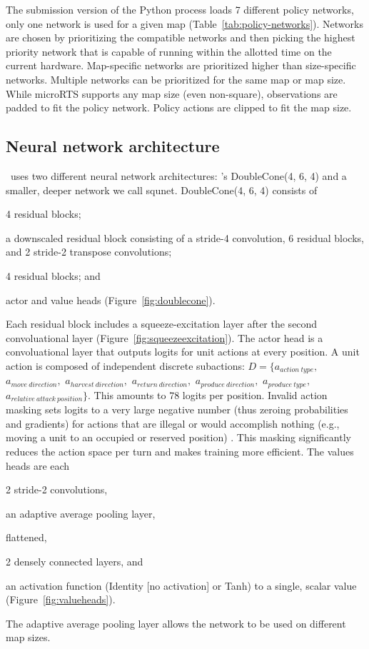\documentclass{article}
\begin{document}
The submission version of the Python process loads 7 different policy networks, only one network is used
for a given map (Table~\ref{tab:policy-networks}). Networks are chosen by prioritizing
the compatible networks and then picking the highest priority network that is capable of
running within the allotted time on the current hardware. Map-specific networks are
prioritized higher than size-specific networks. Multiple networks can be prioritized for
the same map or map size. While microRTS supports any map size (even non-square),
observations are padded to fit the policy network. Policy actions are clipped to fit the
map size.

\subsection{Neural network architecture}
\agentName\ uses two different neural network architectures: \citet{Ferdinand2021doublecone}'s DoubleCone(4, 6, 4) and a smaller, deeper network
we call squnet. DoubleCone(4, 6, 4) consists of
\begin{inparaenum}[(1)]
    \item 4 residual blocks;
    \item a downscaled residual block consisting of a stride-4 convolution, 6 residual blocks, and
        2 stride-2 transpose convolutions;
    \item 4 residual blocks; and
    \item actor and value heads (Figure~\ref{fig:doublecone}).
\end{inparaenum}
Each residual block includes a squeeze-excitation layer after the second convoluational
layer (Figure~\ref{fig:squeezeexcitation}). The actor head is a convoluational layer
that outputs logits for unit actions at every position. A unit action is composed of
independent discrete subactions: $D = \{a_{action\ type},$ $a_{move\ direction},$ $a_{harvest\
direction},$ $a_{return\ direction},$ $a_{produce\ direction},$ $a_{produce\ type},$ $a_{relative\
attack\ position}\}$. This amounts to 78 logits per position. Invalid action masking sets
logits to a very large negative number (thus zeroing probabilities and gradients) for actions that are
illegal or would accomplish nothing (e.g., moving a unit to an occupied or reserved
position) \citep{DBLP:journals/corr/abs-2006-14171}. This masking significantly reduces
the action space per turn and makes training more efficient. The values heads are each 
\begin{inparaenum}[(1)]
    \item 2 stride-2 convolutions,
    \item an adaptive average pooling layer,
    \item flattened,
    \item 2 densely connected layers, and
    \item an activation function (Identity [no activation] or Tanh) to a single, scalar value (Figure~\ref{fig:valueheads}).
\end{inparaenum}
The adaptive average pooling layer allows the network to be used on different map sizes.
\end{document}
